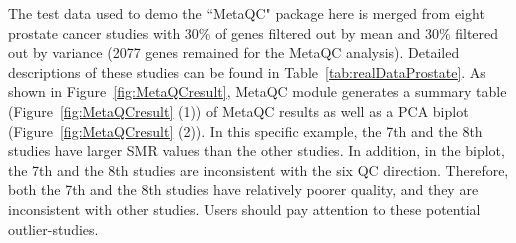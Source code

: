 The test data used to demo the ``MetaQC" package here is merged from eight prostate cancer studies with 30\% of genes filtered out by mean and 30\% filtered out by variance (2077 genes remained for the MetaQC analysis). 
Detailed descriptions of these studies can be found in Table~\ref{tab:realDataProstate}. 
As shown in Figure~\ref{fig:MetaQCresult}, 
MetaQC module generates a summary table (Figure~\ref{fig:MetaQCresult} {\color{red} (1)}) of MetaQC results 
as well as a PCA biplot (Figure~\ref{fig:MetaQCresult}  {\color{red} (2)}). 
In this specific example, the 7th and the 8th studies have larger SMR values than the other studies.
In addition, in the biplot,  the 7th and the 8th studies are inconsistent with the six QC direction.
Therefore, both the 7th and the 8th studies have relatively poorer quality, and they are inconsistent with other studies.
Users should pay attention to these potential outlier-studies.


